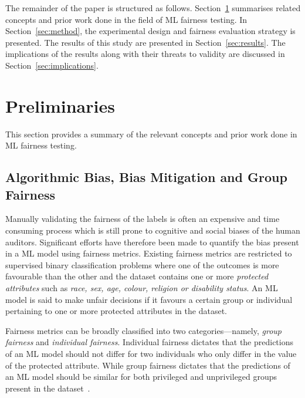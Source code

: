 \documentclass{article}
\begin{document}
The remainder of the paper is structured as follows.
Section \ref{sec:related} summarises related concepts and prior work
done in the field of ML fairness testing. In Section \ref{sec:method},
the experimental design and fairness evaluation strategy is presented.
The results of this study are presented in Section \ref{sec:results}.
The implications of the results along with their threats to validity
are discussed in Section \ref{sec:implications}.

\section{Preliminaries}\label{sec:related}

This section provides a summary of the relevant concepts and prior
work done in ML fairness testing.

\subsection{Algorithmic Bias, Bias Mitigation and Group Fairness}\label{sec:bias-fairness}


Manually validating the fairness of the labels is often an expensive
and time consuming process which is still prone to cognitive and
social biases of the human auditors. Significant efforts have
therefore been made to quantify the bias present in a ML model using
fairness metrics. Existing fairness metrics are restricted to
supervised binary classification problems where one of the outcomes is
more favourable than the other and the dataset contains one or more
\emph{protected attributes} such as \emph{race, sex, age, colour,
religion or disability status}. An ML model is said to make unfair
decisions if it favours a certain group or individual pertaining to
one or more protected attributes in the dataset.

Fairness metrics can be broadly classified into two
categories---namely, \emph{group fairness} and \emph{individual
fairness}. Individual fairness dictates that the predictions of an ML
model should not differ for two individuals who only differ in the
value of the protected attribute. While group fairness dictates that
the predictions of an ML model should be similar for both privileged
and unprivileged groups present in the
dataset \cite{castelnovo2022clarification,hellman2020measuring,mitchell2021algorithmic,kusner2017counterfactual,grgic2016case,dwork2012fairness,barocas2019fairness,barocas2016big,hardt2016equality,binns2018fairness,verma2018fairness,saxena2019fairness}.
\end{document}
